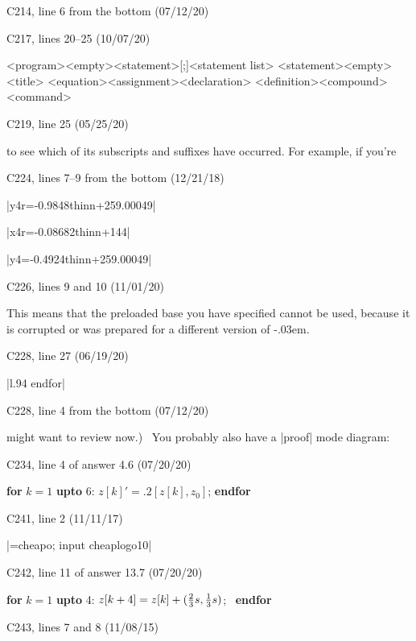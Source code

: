 \bugonpage C214, line 6 from the bottom (07/12/20)

\ninepoint\noindent
\beginsyntax
\endsyntax

\bugonpage C217, lines 20--25 (10/07/20)

\ninepoint\noindent
\beginsyntax
<program>
 \is<empty>\alt<statement>[;]<statement list>
<statement>\is<empty>\alt<title>
 \alt<equation>\alt<assignment>\alt<declaration>
 \alt<definition>\alt<compound>\alt<command>
\endsyntax

\bugonpage C219, line 25 (05/25/20)

\ninepoint\noindent
to see which of its subscripts and suffixes have occurred.
For example, if you're\cutpar

\bugonpage C224, lines 7--9 from the bottom (12/21/18)

\tenpoint\indent
|y4r=-0.9848thinn+259.00049|\par
|x4r=-0.08682thinn+144|\par
|y4=-0.4924thinn+259.00049|

\bugonpage C226, lines 9 and 10 (11/01/20)

\ninepoint\noindent
This means that the preloaded base you have specified cannot be used,
because it is corrupted or was prepared for a different version of
\MF\kern-.03em.

\bugonpage C228, line 27 (06/19/20)

\ninepoint\indent
|l.94 endfor|

\bugonpage C228, line 4 from the bottom (07/12/20)

\ninepoint\noindent
might want to review now.) \
You probably also have a |proof| mode diagram:

\bugonpage C234, line 4 of answer 4.6 (07/20/20)

\ninepoint\indent
{\bf for} $k=1$ {\bf upto} 6: $z[k]'=.2[z[k],z_0]$; {\bf endfor}

\bugonpage C241, line 2 (11/11/17)

\ninepoint\indent
|\mode=cheapo; input cheaplogo10|

\bugonpage C242, line 11 of answer 13.7 (07/20/20)

\ninepoint\indent
{\bf for} $k=1$ {\bf upto} 4:
 $z[k+4]=z[k]+({2\over3}s,{1\over3}s)$; \ {\bf endfor}

\bugonpage C243, lines 7 and 8 (11/08/15)

